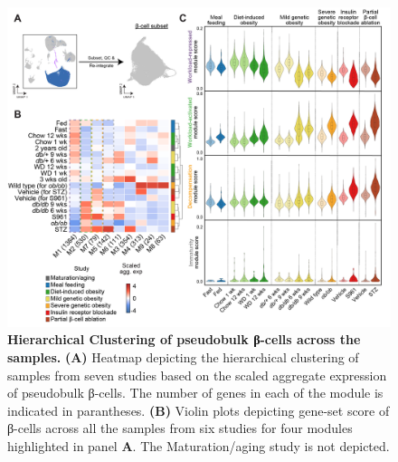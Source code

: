 
\begin{figure}[t]
\centering
\includegraphics[width=\linewidth]{Chapter5/Fig/F3-3-01.png}
\caption[Hierarchical Clustering of pseudobulk β-cells across the samples]{\textbf{Hierarchical Clustering of pseudobulk β-cells across the samples.} \textbf{(A)} Heatmap depicting the hierarchical clustering of samples from seven studies based on the scaled aggregate expression of pseudobulk β-cells. The number of genes in each of the module is indicated in parantheses. \textbf{(B)} Violin plots depicting gene-set score of β-cells across all the samples from six studies for four modules highlighted in panel \textbf{A}. The Maturation/aging study is not depicted.}
\label{fig:3-3}
\end{figure}

